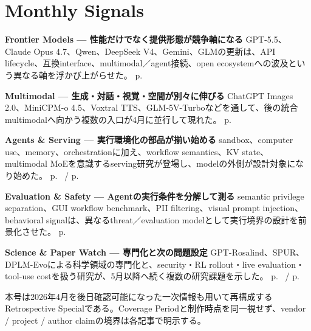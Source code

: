 \section*{Monthly Signals}
\smallskip
\noindent \textbf{Frontier Models — 性能だけでなく提供形態が競争軸になる} GPT-5.5、Claude Opus 4.7、Qwen、DeepSeek V4、Gemini、GLMの更新は、API lifecycle、互換interface、multimodal／agent接続、open ecosystemへの波及という異なる軸を浮かび上がらせた。 \hfill{\footnotesize p.~\pageref{pkg:frontier-models-april}}
\par
\smallskip
\noindent \textbf{Multimodal — 生成・対話・視覚・空間が別々に伸びる} ChatGPT Images 2.0、MiniCPM-o 4.5、Voxtral TTS、GLM-5V-Turboなどを通して、後の統合multimodalへ向かう複数の入口が4月に並行して現れた。 \hfill{\footnotesize p.~\pageref{pkg:multimodal-interfaces-april}}
\par
\smallskip
\noindent \textbf{Agents \& Serving — 実行環境化の部品が揃い始める} sandbox、computer use、memory、orchestrationに加え、workflow semantics、KV state、multimodal MoEを意識するserving研究が登場し、modelの外側が設計対象になり始めた。 \hfill{\footnotesize p.~\pageref{pkg:agents-tooling-april} / p.~\pageref{pkg:inference-serving-april}}
\par
\smallskip
\noindent \textbf{Evaluation \& Safety — Agentの実行条件を分解して測る} semantic privilege separation、GUI workflow benchmark、PII filtering、visual prompt injection、behavioral signalは、異なるthreat／evaluation modelとして実行境界の設計を前景化させた。 \hfill{\footnotesize p.~\pageref{pkg:evaluation-safety-sandbox-april}}
\par
\smallskip
\noindent \textbf{Science \& Paper Watch — 専門化と次の問題設定} GPT-Rosalind、SPUR、DPLM-Evoによる科学領域の専門化と、security・RL rollout・live evaluation・tool-use costを扱う研究が、5月以降へ続く複数の研究課題を示した。 \hfill{\footnotesize p.~\pageref{pkg:ai-science-april} / p.~\pageref{pkg:paper-watch-april}}
\par
\medskip
\begin{claimboundary}
本号は2026年4月を後日確認可能になった一次情報も用いて再構成するRetrospective Specialである。Coverage Periodと制作時点を同一視せず、vendor / project / author claimの境界は各記事で明示する。
\end{claimboundary}
\medskip
\tableofcontents
